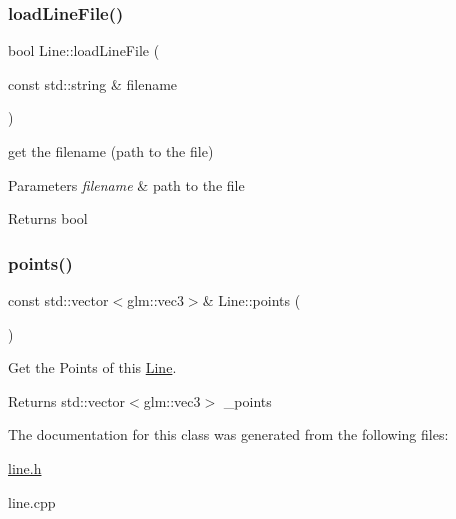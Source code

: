 \subsubsection{\texorpdfstring{load\+Line\+File()}{loadLineFile()}}
{\footnotesize\ttfamily bool Line\+::load\+Line\+File (\begin{DoxyParamCaption}\item[{const std\+::string \&}]{filename }\end{DoxyParamCaption})}



get the filename (path to the file) 


\begin{DoxyParams}{Parameters}
{\em filename} & path to the file \\
\hline
\end{DoxyParams}
\begin{DoxyReturn}{Returns}
bool 
\end{DoxyReturn}
\mbox{\label{class_line_a52f2f2f98db4f7f624e3f47f8b544244}} 
\subsubsection{\texorpdfstring{points()}{points()}}
{\footnotesize\ttfamily const std\+::vector$<$glm\+::vec3$>$\& Line\+::points (\begin{DoxyParamCaption}{ }\end{DoxyParamCaption})\hspace{0.3cm}{\ttfamily [inline]}}



Get the Points of this \hyperlink{class_line}{Line}. 

\begin{DoxyReturn}{Returns}
std\+::vector$<$glm\+::vec3$>$ \+\_\+points 
\end{DoxyReturn}


The documentation for this class was generated from the following files\+:\begin{DoxyCompactItemize}
\item 
\hyperlink{line_8h}{line.\+h}\item 
line.\+cpp\end{DoxyCompactItemize}
